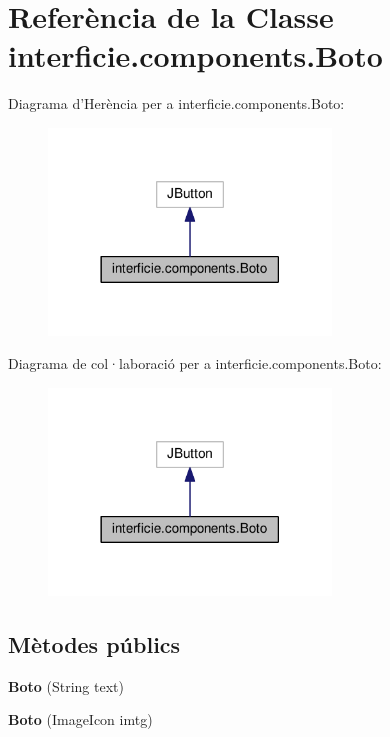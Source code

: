 \hypertarget{classinterficie_1_1components_1_1_boto}{\section{Referència de la Classe interficie.\+components.\+Boto}
\label{classinterficie_1_1components_1_1_boto}
}


Diagrama d'Herència per a interficie.\+components.\+Boto\+:\nopagebreak
\begin{figure}[H]
\begin{center}
\leavevmode
\includegraphics[width=213pt]{classinterficie_1_1components_1_1_boto__inherit__graph}
\end{center}
\end{figure}


Diagrama de col·laboració per a interficie.\+components.\+Boto\+:\nopagebreak
\begin{figure}[H]
\begin{center}
\leavevmode
\includegraphics[width=213pt]{classinterficie_1_1components_1_1_boto__coll__graph}
\end{center}
\end{figure}
\subsection*{Mètodes públics}
\begin{DoxyCompactItemize}
\item 
\hypertarget{classinterficie_1_1components_1_1_boto_ae89f1f219f8f1fe0ec0b3416d17f032c}{{\bfseries Boto} (String text)}\label{classinterficie_1_1components_1_1_boto_ae89f1f219f8f1fe0ec0b3416d17f032c}

\item 
\hypertarget{classinterficie_1_1components_1_1_boto_ae4fbe39dfa541ee34a52b0a4727d3e9b}{{\bfseries Boto} (Image\+Icon imtg)}\label{classinterficie_1_1components_1_1_boto_ae4fbe39dfa541ee34a52b0a4727d3e9b}

\end{DoxyCompactItemize}
